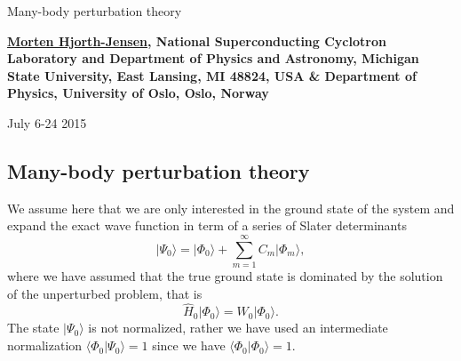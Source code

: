 \documentclass[%
twoside,                 %
final,                   %
10pt]{article}
\begin{document}






\thispagestyle{empty}

\begin{center}
{\LARGE\bf
\begin{spacing}{1.25}
Many-body perturbation theory
\end{spacing}
}
\end{center}


\begin{center}
{\bf \href{{http://computationalphysics.no}}{Morten Hjorth-Jensen}, National Superconducting Cyclotron Laboratory and Department of Physics and Astronomy, Michigan State University, East Lansing, MI 48824, USA {\&} Department of Physics, University of Oslo, Oslo, Norway${}^{}$} \\ [0mm]
\end{center}

    \begin{center}
\end{center}
    

\begin{center} %
July 6-24 2015
\end{center}

\vspace{1cm}


\tableofcontents


\vspace{1cm} %




\subsection*{Many-body perturbation theory}

We assume here that we are only interested in the ground state of the system and 
expand the exact wave function in term of a series of Slater determinants
\[
\vert \Psi_0\rangle = \vert \Phi_0\rangle + \sum_{m=1}^{\infty}C_m\vert \Phi_m\rangle,
\]
where we have assumed that the true ground state is dominated by the 
solution of the unperturbed problem, that is
\[
\hat{H}_0\vert \Phi_0\rangle= W_0\vert \Phi_0\rangle.
\]
The state $\vert \Psi_0\rangle$ is not normalized, rather we have used an intermediate 
normalization $\langle \Phi_0 \vert \Psi_0\rangle=1$ since we have $\langle \Phi_0\vert \Phi_0\rangle=1$. 
\end{document}
